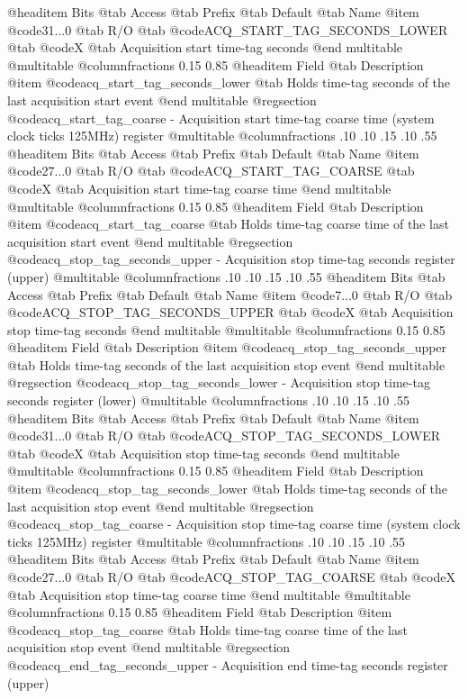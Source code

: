 @headitem Bits @tab Access @tab Prefix @tab Default @tab Name
@item @code{31...0}
@tab R/O @tab
@code{ACQ_START_TAG_SECONDS_LOWER}
@tab @code{X} @tab 
Acquisition start time-tag seconds
@end multitable
@multitable @columnfractions 0.15 0.85
@headitem Field @tab Description
@item @code{acq_start_tag_seconds_lower} @tab Holds time-tag seconds of the last acquisition start event
@end multitable
@regsection @code{acq_start_tag_coarse} - Acquisition start time-tag coarse time (system clock ticks 125MHz) register
@multitable @columnfractions .10 .10 .15 .10 .55
@headitem Bits @tab Access @tab Prefix @tab Default @tab Name
@item @code{27...0}
@tab R/O @tab
@code{ACQ_START_TAG_COARSE}
@tab @code{X} @tab 
Acquisition start time-tag coarse time
@end multitable
@multitable @columnfractions 0.15 0.85
@headitem Field @tab Description
@item @code{acq_start_tag_coarse} @tab Holds time-tag coarse time of the last acquisition start event
@end multitable
@regsection @code{acq_stop_tag_seconds_upper} - Acquisition stop time-tag seconds register (upper)
@multitable @columnfractions .10 .10 .15 .10 .55
@headitem Bits @tab Access @tab Prefix @tab Default @tab Name
@item @code{7...0}
@tab R/O @tab
@code{ACQ_STOP_TAG_SECONDS_UPPER}
@tab @code{X} @tab 
Acquisition stop time-tag seconds
@end multitable
@multitable @columnfractions 0.15 0.85
@headitem Field @tab Description
@item @code{acq_stop_tag_seconds_upper} @tab Holds time-tag seconds of the last acquisition stop event
@end multitable
@regsection @code{acq_stop_tag_seconds_lower} - Acquisition stop time-tag seconds register (lower)
@multitable @columnfractions .10 .10 .15 .10 .55
@headitem Bits @tab Access @tab Prefix @tab Default @tab Name
@item @code{31...0}
@tab R/O @tab
@code{ACQ_STOP_TAG_SECONDS_LOWER}
@tab @code{X} @tab 
Acquisition stop time-tag seconds
@end multitable
@multitable @columnfractions 0.15 0.85
@headitem Field @tab Description
@item @code{acq_stop_tag_seconds_lower} @tab Holds time-tag seconds of the last acquisition stop event
@end multitable
@regsection @code{acq_stop_tag_coarse} - Acquisition stop time-tag coarse time (system clock ticks 125MHz) register
@multitable @columnfractions .10 .10 .15 .10 .55
@headitem Bits @tab Access @tab Prefix @tab Default @tab Name
@item @code{27...0}
@tab R/O @tab
@code{ACQ_STOP_TAG_COARSE}
@tab @code{X} @tab 
Acquisition stop time-tag coarse time
@end multitable
@multitable @columnfractions 0.15 0.85
@headitem Field @tab Description
@item @code{acq_stop_tag_coarse} @tab Holds time-tag coarse time of the last acquisition stop event
@end multitable
@regsection @code{acq_end_tag_seconds_upper} - Acquisition end time-tag seconds register (upper)
